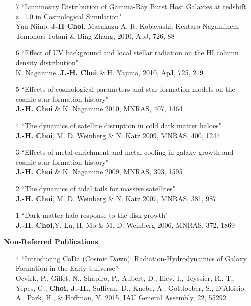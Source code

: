 \documentclass [11pt]{article}
\begin{document}
{{\begin{enumerate}
\item[7]``Luminosity Distribution of Gamma-Ray Burst Host Galaxies at redshift z=1.0 in Cosmological Simulation" \\ Yuu Niino, \textbf{J-H Choi}, Masakazu A. R. Kobayashi, Kentaro Nagaminem Tomonori Totani \& Bing Zhang, 2010, ApJ, 726, 88

\item[6]``Effect of UV background and local stellar radiation on the HI column density distribution" \\  K. Nagamine, \textbf{J.-H. Choi} \& H. Yajima, 2010, ApJ, 725, 219

\item[5]``Effects of cosmological parameters and star formation models on the cosmic star formation history" \\  \textbf{J.-H. Choi} \& K. Nagamine 2010, MNRAS, 407, 1464

\item[4]``The dynamics of satellite disruption in cold dark matter haloes" \\  \textbf{J.-H. Choi}, M. D. Weinberg \& N. Katz 2009, MNRAS, 400, 1247

\item[3]``Effects of metal enrichment and metal cooling in galaxy growth and cosmic star formation history" \\  \textbf{J.-H. Choi} \& K. Nagamine 2009, MNRAS, 393, 1595

\item[2] ``The dynamics of tidal tails for massive satellites" \\  \textbf{J.-H. Choi}, M. D. Weinberg \& N. Katz 2007, MNRAS, 381, 987

\item[1]``Dark matter halo response to the disk growth" \\  \textbf{J.-H. Choi},Y. Lu, H. Mo \& M. D. Weinberg 2006, MNRAS, 372, 1869

\end{enumerate}

\vspace{.1in}
\noindent
{\textbf{Non-Referred Publications}}
\begin{enumerate}

\item[4] ``Introducing CoDa (Cosmic Dawn): Radiation-Hydrodynamics of Galaxy Formation in the Early Universe''\\ Ocvirk, P., Gillet, N., Shapiro, P., Aubert, D., Iliev, I., Teyssier, R., T., Yepes, G., \textbf{Choi, J.-H.}, Sullivan, D., Knebe, A., Gottloeber, S., D'Aloisio, A., Park, H., \& Hoffman, Y. 2015, IAU General Assembly, 22, 55292


\end{enumerate}}}
\end{document}
